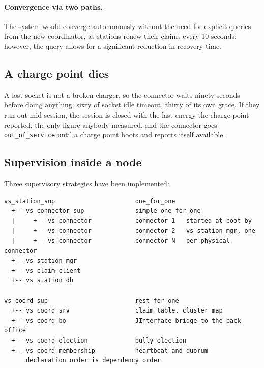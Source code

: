 \paragraph{Convergence via two paths.} 
The system would converge autonomously without the need for explicit queries from the new coordinator, as stations renew their claims every 10 seconds;
however, the query allows for a significant reduction in recovery time.

\subsection{A charge point dies}
\label{sec:cp-failure}

A lost socket is not a broken charger, so the connector waits ninety seconds
before doing anything: sixty of socket idle timeout, thirty of its own grace. If
they run out mid-session, the session is closed with the last energy the charge
point reported, the only figure anybody measured, and the connector goes
\texttt{out\_of\_service} until a charge point boots and reports itself available.

\subsection{Supervision inside a node}
\label{sec:supervision}


Three supervisory strategies have been implemented:

\begin{lstlisting}[caption={The two supervision trees. The station nests a second
                   supervisor inside the first; the coordinator does not.},
                   label={lst:suptrees}]
vs_station_sup                      one_for_one
  +-- vs_connector_sup              simple_one_for_one
  |     +-- vs_connector            connector 1   started at boot by
  |     +-- vs_connector            connector 2   vs_station_mgr, one
  |     +-- vs_connector            connector N   per physical connector
  +-- vs_station_mgr
  +-- vs_claim_client
  +-- vs_station_db

vs_coord_sup                        rest_for_one
  +-- vs_coord_srv                  claim table, cluster map
  +-- vs_coord_bo                   JInterface bridge to the back office
  +-- vs_coord_election             bully election
  +-- vs_coord_membership           heartbeat and quorum
      declaration order is dependency order
\end{lstlisting}

